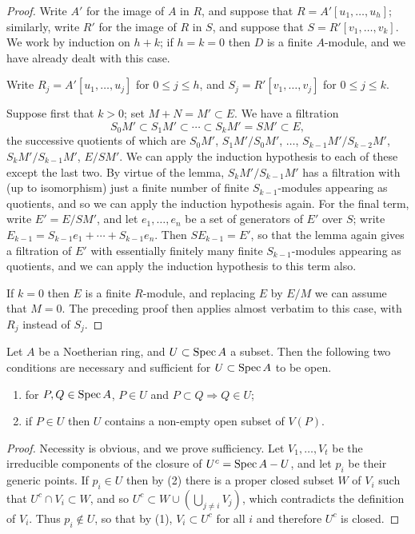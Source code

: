 \begin{proof}
Write $A'$ for the image of $A$ in $R$, and suppose that
$R = A'[u_1, \ldots, u_h]$; similarly, write $R'$ for the image of $R$ in $S$, and
suppose that $S = R'[v_1, \ldots, v_k]$. We work by induction on $h + k$; if
$h = k = 0$ then $D$ is a finite $A$-module, and we have already dealt with this
case.

Write $R_j = A'[u_1, \ldots, u_j]$ for $0 \le j \le h$, and
$S_j = R'[v_1, \ldots, v_j]$ for $0 \le j \le k$.

Suppose first that $k > 0$; set $M + N = M' \subset E$. We have a filtration
\[
  S_0M' \subset S_1M' \subset \cdots \subset S_kM' = SM' \subset E,
\]
the successive quotients of which are $S_0M'$, $S_1M'/S_0M'$, $\ldots$,
$S_{k-1}M'/S_{k-2}M'$, $S_kM'/S_{k-1}M'$, $E/SM'$. We can apply the induction
hypothesis to each of these except the last two. By virtue of the lemma,
$S_kM'/S_{k-1}M'$ has a filtration with (up to isomorphism) just a finite number
of finite $S_{k-1}$-modules appearing as quotients, and so we can apply the
induction hypothesis again. For the final term, write $E' = E/SM'$, and let
$e_1, \ldots, e_n$ be a set of generators of $E'$ over $S$; write
$E_{k-1} = S_{k-1}e_1 + \cdots + S_{k-1}e_n$. Then $SE_{k-1} = E'$, so that the lemma
again gives a filtration of $E'$ with essentially finitely many finite
$S_{k-1}$-modules appearing as quotients, and we can apply the induction
hypothesis to this term also.

If $k = 0$ then $E$ is a finite $R$-module, and replacing $E$ by $E/M$ we can
assume that $M = 0$. The preceding proof then applies almost verbatim to this
case, with $R_j$ instead of $S_j$.
\end{proof}

\begin{theorem}\label{thm:24.2}
Let $A$ be a Noetherian ring, and $U \subset \operatorname{Spec} A$ a subset. Then the following
two conditions are necessary and sufficient for $U \subset \operatorname{Spec} A$ to be open.
\begin{enumerate}[(1)]
  \item for $P, Q \in \operatorname{Spec} A$, $P \in U$ and $P \subset Q \Rightarrow Q \in U$;
  \item if $P \in U$ then $U$ contains a non-empty open subset of $V(P)$.
\end{enumerate}
\end{theorem}

\begin{proof}
Necessity is obvious, and we prove sufficiency. Let $V_1, \ldots, V_t$ be the
irreducible components of the closure of $U^c = \operatorname{Spec} A - U$, and let $p_i$ be
their generic points. If $p_i \in U$ then by (2) there is a proper closed subset
$W$ of $V_i$ such that $U^c \cap V_i \subset W$, and so
$U^c \subset W \cup (\bigcup_{j \neq i} V_j)$, which contradicts the definition of
$V_i$. Thus $p_i \notin U$, so that by (1), $V_i \subset U^c$ for all $i$ and therefore
$U^c$ is closed.
\end{proof}

